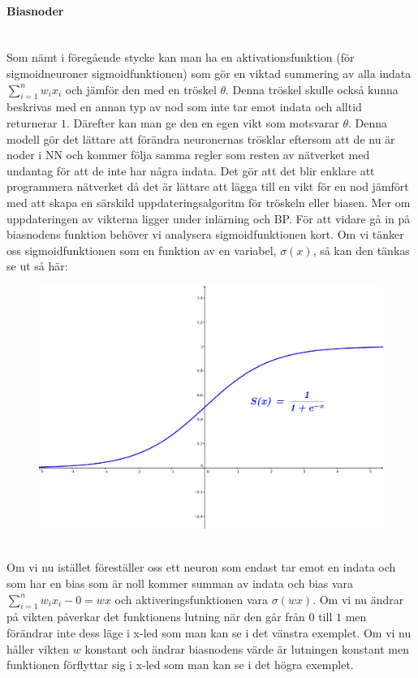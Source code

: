 \documentclass[a4paper,10pt]{article}
\begin{document}
\paragraph{Biasnoder}\hspace{0pt}\\
Som nämt i föregående stycke kan man ha en aktivationsfunktion (för sigmoidneuroner sigmoidfunktionen) som gör en viktad summering av alla indata $\sum_{i=1}^{n} {w_ix_i}$ och jämför den med en tröskel $\theta$. Denna tröskel skulle också kunna beskrivas med en annan typ av nod som inte tar emot indata och alltid\\ returnerar $1$. Därefter kan man ge den en egen vikt som motsvarar $\theta$. Denna modell gör det lättare att förändra neuronernas trösklar eftersom att de nu är noder i NN och kommer följa samma regler som resten av nätverket med undantag för att de inte har några indata. Det gör att det blir enklare att programmera nätverket då det är lättare att lägga till en vikt för en nod jämfört med att skapa en särskild uppdateringsalgoritm för tröskeln eller biasen. Mer om uppdateringen av vikterna ligger under inlärning och BP. För att vidare gå in på biasnodens funktion behöver vi analysera sigmoidfunktionen kort. Om vi tänker oss sigmoidfunktionen som en funktion av en variabel, $\sigma(x)$, så kan den tänkas se ut så här:
\begin{figure}[ht]
\includegraphics{Sigmoid}\centering
\end{figure}\\
Om vi nu istället föreställer oss ett neuron som endast tar emot en indata och som har en bias som är noll kommer summan av indata och bias vara $\sum_{i=1}^{n} {w_ix_i} -0=wx$ och aktiveringsfunktionen vara $\sigma(wx)$. Om vi nu ändrar på vikten påverkar det funktionens lutning när den går från $0$ till $1$ men förändrar inte dess läge i x-led som man kan se i det vänstra exemplet. Om vi nu håller vikten $w$ konstant och ändrar biasnodens värde är lutningen konstant men funktionen förflyttar sig i x-led som man kan se i det högra exemplet.
\end{document}
